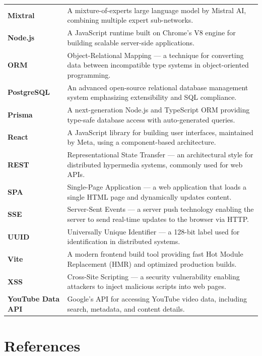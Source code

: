 \documentclass[12pt,a4paper]{report}
\begin{document}
\begin{longtable}{l p{10cm}}
\textbf{Mixtral}      & A mixture-of-experts large language model by Mistral AI, combining multiple expert sub-networks. \\
\textbf{Node.js}      & A JavaScript runtime built on Chrome's V8 engine for building scalable server-side applications. \\
\textbf{ORM}          & Object-Relational Mapping --- a technique for converting data between incompatible type systems in object-oriented programming. \\
\textbf{PostgreSQL}   & An advanced open-source relational database management system emphasizing extensibility and SQL compliance. \\
\textbf{Prisma}       & A next-generation Node.js and TypeScript ORM providing type-safe database access with auto-generated queries. \\
\textbf{React}        & A JavaScript library for building user interfaces, maintained by Meta, using a component-based architecture. \\
\textbf{REST}         & Representational State Transfer --- an architectural style for distributed hypermedia systems, commonly used for web APIs. \\
\textbf{SPA}          & Single-Page Application --- a web application that loads a single HTML page and dynamically updates content. \\
\textbf{SSE}          & Server-Sent Events --- a server push technology enabling the server to send real-time updates to the browser via HTTP. \\
\textbf{UUID}         & Universally Unique Identifier --- a 128-bit label used for identification in distributed systems. \\
\textbf{Vite}         & A modern frontend build tool providing fast Hot Module Replacement (HMR) and optimized production builds. \\
\textbf{XSS}          & Cross-Site Scripting --- a security vulnerability enabling attackers to inject malicious scripts into web pages. \\
\textbf{YouTube Data API} & Google's API for accessing YouTube video data, including search, metadata, and content details. \\
\end{longtable}


\chapter*{References}
\end{document}
